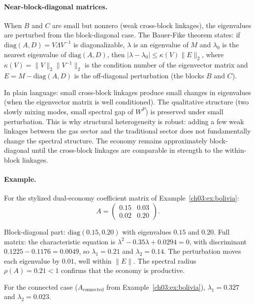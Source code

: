 \documentclass[../structural_economics_book.tex]{subfiles}
\begin{document}
\paragraph{Near-block-diagonal matrices.} When $B$ and $C$ are small but nonzero (weak cross-block linkages), the eigenvalues are perturbed from the block-diagonal case. The Bauer-Fike theorem \citep[Thm.~6.3.2]{horn2012matrix} states: if $\text{diag}(A, D) = V\Lambda V^{-1}$ is diagonalizable, $\lambda$ is an eigenvalue of $M$ and $\lambda_0$ is the nearest eigenvalue of $\text{diag}(A, D)$, then $|\lambda - \lambda_0| \leq \kappa(V)\|E\|_2$, where $\kappa(V) = \|V\|_2\|V^{-1}\|_2$ is the condition number of the eigenvector matrix and $E = M - \text{diag}(A, D)$ is the off-diagonal perturbation (the blocks $B$ and $C$).

In plain language: small cross-block linkages produce small changes in eigenvalues (when the eigenvector matrix is well conditioned). The qualitative structure (two slowly mixing modes, small spectral gap of $W^P$) is preserved under small perturbation. This is why structural heterogeneity is robust: adding a few weak linkages between the gas sector and the traditional sector does not fundamentally change the spectral structure. The economy remains approximately block-diagonal until the cross-block linkages are comparable in strength to the within-block linkages.

\paragraph{Example.} For the stylized dual-economy coefficient matrix of Example~\ref{ch03:ex:bolivia}:
\begin{equation}
A = \begin{pmatrix} 0.15 & 0.03 \\ 0.02 & 0.20 \end{pmatrix}.
\end{equation}

Block-diagonal part: $\text{diag}(0.15, 0.20)$ with eigenvalues $0.15$ and $0.20$. Full matrix: the characteristic equation is $\lambda^2 - 0.35\lambda + 0.0294 = 0$, with discriminant $0.1225 - 0.1176 = 0.0049$, so $\lambda_1 = 0.21$ and $\lambda_2 = 0.14$. The perturbation moves each eigenvalue by $0.01$, well within $\|E\|$. The spectral radius $\rho(A) = 0.21 < 1$ confirms that the economy is productive.

For the connected case ($A_{\text{connected}}$ from Example~\ref{ch03:ex:bolivia}), $\lambda_1 = 0.327$ and $\lambda_2 = 0.023$.
\end{document}
